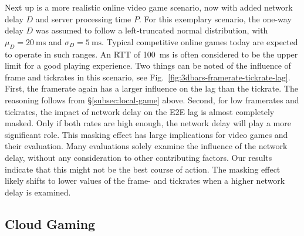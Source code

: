 Next up is a more realistic online video game scenario, now with added network delay $D$ and server processing time $P$. For this exemplary scenario, the one-way delay $D$ was assumed to follow a left-truncated normal distribution, with $\mu_D = \SI{20}{\milli\second}$ and $\sigma_D = \SI{5}{\milli\second}$. Typical competitive online games today are expected to operate in such ranges. An \acrshort{RTT} of \SI{100}{\milli\second} is often considered to be the upper limit for a good playing experience. Two things can be noted of the influence of frame and tickrates in this scenario, see Fig.~\ref{fig:3dbars-framerate-tickrate-lag}. First, the framerate again has a larger influence on the lag than the tickrate. The reasoning follows from §\ref{subsec:local-game} above. Second, for low framerates and tickrates, the impact of network delay on the \gls{E2E} lag is almost completely masked. Only if both rates are high enough, the network delay will play a more significant role. This masking effect has large implications for video games and their evaluation. Many evaluations solely examine the influence of the network delay, without any consideration to other contributing factors. Our results indicate that this might not be the best course of action. The masking effect likely shifts to lower values of the frame- and tickrates when a higher network delay is examined.



\subsection{Cloud Gaming}
\label{subsec:cloud-gaming}

